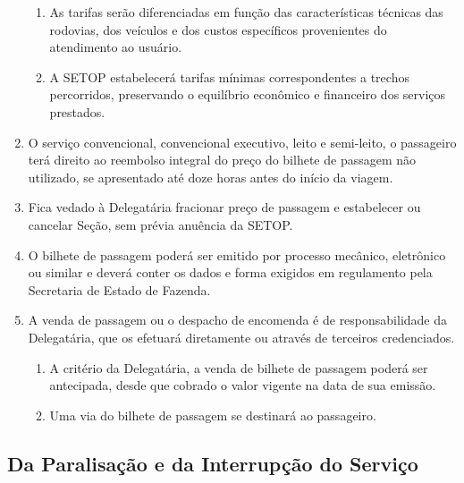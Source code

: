\begin{enumerate}[resume, label=Art. \arabic*]
\begin{enumerate}[label= \S \arabic*]
\item As tarifas serão diferenciadas em função das características técnicas das rodovias, dos veículos e dos custos específicos provenientes do atendimento ao usuário.

\item A SETOP estabelecerá tarifas mínimas correspondentes a trechos percorridos, preservando o equilíbrio econômico e financeiro dos serviços prestados.

\end{enumerate}

\item O serviço convencional, convencional executivo, leito e semi-leito, o passageiro terá direito ao reembolso integral do preço do bilhete de passagem não utilizado, se apresentado até doze horas antes do início da viagem.

\item Fica vedado à Delegatária fracionar preço de passagem e estabelecer ou cancelar Seção, sem prévia anuência da SETOP.

\item O bilhete de passagem poderá ser emitido por processo mecânico, eletrônico ou similar e deverá conter os dados e forma exigidos em regulamento pela Secretaria de Estado de Fazenda.

\item A venda de passagem ou o despacho de encomenda é de responsabilidade da Delegatária, que os efetuará diretamente ou através de terceiros credenciados.

\begin{enumerate}[label= \S \arabic*] %

\item A critério da Delegatária, a venda de bilhete de passagem poderá ser antecipada, desde que cobrado o valor vigente na data de sua emissão.

\item Uma via do bilhete de passagem se destinará ao passageiro.

\end{enumerate}

\end{enumerate}

\subsection{Da Paralisação e da Interrupção do Serviço}

